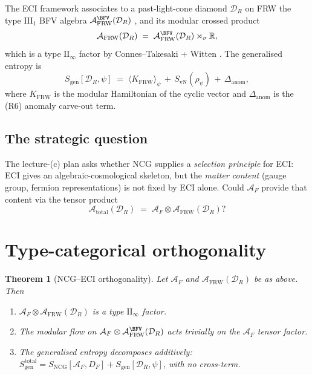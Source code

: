 \documentclass[11pt,a4paper]{article}
\newtheorem{theorem}{Theorem}[section]
\theoremstyle{definition}
\newcommand{\R}{\mathbb{R}}
\newcommand{\cA}{\mathcal{A}}
\newcommand{\cD}{\mathcal{D}}
\newcommand{\NCG}{\mathrm{NCG}}
\newcommand{\FRW}{\mathrm{FRW}}
\newcommand{\gen}{\mathrm{gen}}
\newcommand{\vN}{\mathrm{vN}}
\begin{document}
The ECI framework \cite{ECI-FRW-note} associates to a past-light-cone
diamond $\cD_R$ on FRW the type $\mathrm{III}_1$ BFV algebra
$\cA_\FRW^\BFV(\cD_R)$ \cite{BFV03}, and its modular crossed product
\begin{equation}
\cA_\FRW(\cD_R) \;=\; \cA_\FRW^\BFV(\cD_R) \rtimes_\sigma \R,
\end{equation}
which is a type $\mathrm{II}_\infty$ factor by Connes--Takesaki +
Witten \cite{Connes73,Witten2022}. The generalised entropy is
\begin{equation}\label{eq:Sgen}
S_\gen[\cD_R, \psi] \;=\; \langle K_\FRW \rangle_\psi
\,+\, S_\vN(\rho_\psi)
\,+\, \Delta_\mathrm{anom},
\end{equation}
where $K_\FRW$ is the modular Hamiltonian of the cyclic vector and
$\Delta_\mathrm{anom}$ is the (R6) anomaly carve-out term.

\subsection{The strategic question}

The lecture-(c) plan asks whether NCG supplies a \emph{selection
principle} for ECI: ECI gives an algebraic-cosmological skeleton, but
the \emph{matter content} (gauge group, fermion representations) is not
fixed by ECI alone. Could $\cA_F$ provide that content via the tensor
product
\begin{equation}\label{eq:tensor}
\cA_\mathrm{total}(\cD_R) \;=\; \cA_F \otimes \cA_\FRW(\cD_R)?
\end{equation}

\section{Type-categorical orthogonality}\label{sec:orthog}

\begin{theorem}[NCG--ECI orthogonality]\label{thm:orthog}
Let $\cA_F$ and $\cA_\FRW(\cD_R)$ be as above. Then
\begin{enumerate}\setlength\itemsep{2pt}
\item[(i)] $\cA_F \otimes \cA_\FRW(\cD_R)$ is a type $\mathrm{II}_\infty$
factor.
\item[(ii)] The modular flow on
$\cA_F \otimes \cA_\FRW^\BFV(\cD_R)$ acts trivially on the $\cA_F$ tensor
factor.
\item[(iii)] The generalised entropy decomposes additively:
$S_\gen^\mathrm{total} = S_\NCG[\cA_F,D_F] + S_\gen[\cD_R,\psi]$, with
no cross-term.
\end{enumerate}
\end{theorem}
\end{document}
